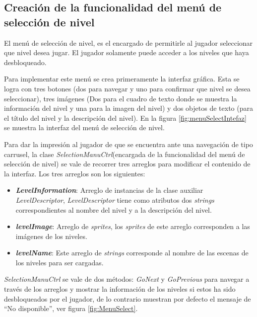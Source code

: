 \subsection{Creación de la funcionalidad del menú de selección de nivel}
El menú de selección de nivel, es el encargado de permitirle al jugador seleccionar
que nivel desea jugar. El jugador solamente puede acceder a los niveles que haya
desbloqueado.
\\
\par
Para implementar este menú se crea primeramente la interfaz gráfica. Esta se logra
con tres botones (dos para navegar y uno para confirmar que nivel se desea
seleccionar), tres imágenes (Dos para el cuadro de texto donde se muestra la
información del nivel y una para la imagen del nivel) y dos objetos de texto (para
el título del nivel y la descripción del nivel). En la figura
\ref{fig:menuSelectIntefaz} se muestra la interfaz del menú de selección de
nivel.
\\
\par
Para dar la impresión al jugador de que se encuentra ante una navegación de tipo
carrusel, la clase \textit{SelectionManuCtrl}(encargada de la funcionalidad del
menú de selección de nivel) se vale de recorrer tres arreglos para modificar el
contenido de la interfaz. Los tres arreglos son los siguientes:
\begin{itemize}
    \item \textit{\textbf{LevelInformation}}: Arreglo de instancias de la clase
    auxiliar \textit{LevelDescriptor}, \textit{LevelDescriptor} tiene como atributos
    dos \textit{strings} correspondientes al nombre del nivel y a la descripción del
    nivel.
    \item \textit{\textbf{levelImage}}: Arreglo de \textit{sprites}, los
    \textit{sprites} de este arreglo corresponden a las imágenes de los niveles.
    \item \textit{\textbf{levelName}}:    Este arreglo de \textit{strings} corresponde
    al nombre de las escenas de los niveles para ser cargadas.    
\end{itemize}  
\textit{SelectionManuCtrl} se vale de dos métodos: \textit{GoNext} y
\textit{GoPrevious} para navegar a través de los arreglos y mostrar la información
de los niveles si estos ha sido desbloqueados por el jugador, de lo contrario
muestran por defecto el mensaje de “No disponible”, ver figura \ref{fig:MenuSelect}.   

